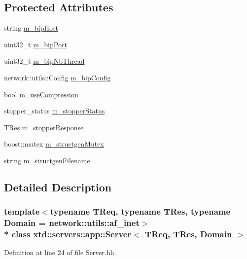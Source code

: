 \subsection*{Protected Attributes}
\begin{DoxyCompactItemize}
\item 
string \hyperlink{classxtd_1_1servers_1_1app_1_1Server_a08752041a6fc98289ad93c93c1d4fd75}{m\+\_\+bip\+Host}
\item 
uint32\+\_\+t \hyperlink{classxtd_1_1servers_1_1app_1_1Server_a849adda20d929ad1116564177986e146}{m\+\_\+bip\+Port}
\item 
uint32\+\_\+t \hyperlink{classxtd_1_1servers_1_1app_1_1Server_a4e7cb3d792a27b1572aa775f8f0018f3}{m\+\_\+bip\+Nb\+Thread}
\item 
network\+::utils\+::\+Config \hyperlink{classxtd_1_1servers_1_1app_1_1Server_a62a3f48e47eba551b53d0bef859aa906}{m\+\_\+bip\+Config}
\item 
bool \hyperlink{classxtd_1_1servers_1_1app_1_1Server_a143d0eeee15dd57ba4d03737a0128551}{m\+\_\+use\+Compression}
\item 
stopper\+\_\+status \hyperlink{classxtd_1_1servers_1_1app_1_1Server_ae5180a630e0f23596a0909f845d00e69}{m\+\_\+stopper\+Status}
\item 
T\+Res \hyperlink{classxtd_1_1servers_1_1app_1_1Server_afb80e8da001aafc8ffbf5b2dd8a9213e}{m\+\_\+stopper\+Response}
\item 
boost\+::mutex \hyperlink{classxtd_1_1servers_1_1app_1_1Server_a3ad929be560e47d7193da946cd74e557}{m\+\_\+structgen\+Mutex}
\item 
string \hyperlink{classxtd_1_1servers_1_1app_1_1Server_a66a9242f7a55a296f1ca25cb18764eec}{m\+\_\+structgen\+Filename}
\end{DoxyCompactItemize}


\subsection{Detailed Description}
\subsubsection*{template$<$typename T\+Req, typename T\+Res, typename Domain = network\+::utils\+::af\+\_\+inet$>$\\*
class xtd\+::servers\+::app\+::\+Server$<$ T\+Req, T\+Res, Domain $>$}



Definition at line 24 of file Server.\+hh.



